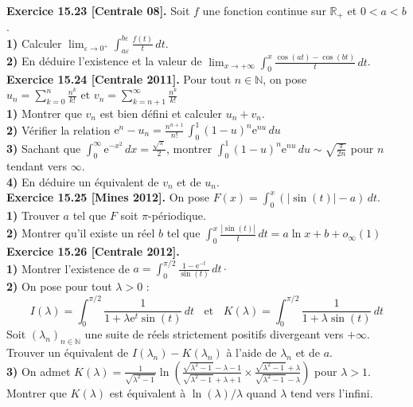 \documentclass[a4paper,12pt,francais]{article}
\newcommand{\field}[1]{\mathbb{#1}}
\newcommand{\N}{\field{N}}
\newcommand{\R}{\field{R}}
\newcommand{\e}{\mbox{e}}
\begin{document}
\noindent
{\bf Exercice 15.23 [Centrale 08].} Soit $f$ une fonction continue sur $\R_+$ et $0<a<b$.\\
{\bf 1)} Calculer $\displaystyle \lim_{\varepsilon \to 0^+} \int_{a\varepsilon}^{b\varepsilon} \frac{f(t)}{t}\, dt$.\\
{\bf 2)} En déduire l'existence et la valeur de $\displaystyle \lim_{x\to +\infty} \int_0^x \frac{\cos(at)-\cos(bt)}{t}\, dt$.\\

\noindent
{\bf Exercice 15.24 [Centrale 2011].} Pour tout $n \in \N$, on pose
$\displaystyle u_n=\sum_{k=0}^n \frac{n^k}{k!} \mbox{ et } v_n=\sum_{k=n+1}^\infty \frac{n^k}{k!}$\\
{\bf 1)} Montrer que $v_n$ est bien défini et calculer $u_n+v_n$.\\
{\bf 2)} Vérifier la relation
$\displaystyle \e^n-u_n=\frac{n^{n+1}}{n!} \, \int_0^1 (1-u)^n \e^{nu}\, du$\\
{\bf 3)} Sachant que $\displaystyle \int_0^\infty \e^{-x^2}\, dx =\frac{\sqrt{\pi}}{2}$, montrer 
$\displaystyle \int_0^1 (1-u)^n \e^{nu}\, du \sim \sqrt{\frac{\pi}{2n}}$ pour $n$ tendant vers $\infty$.\\
{\bf 4)} En déduire un équivalent de $v_n$ et de $u_n$.\\

\noindent
{\bf Exercice 15.25 [Mines 2012].} On pose $F(x)=\int_0^x (|\sin(t)|-a)\, dt$.\\
{\bf 1)} Trouver $a$ tel que $F$ soit $\pi$-périodique.\\
{\bf 2)} Montrer qu'il existe un réel $b$ tel que $\displaystyle \int_0^x \frac{|\sin(t)|}{t}\, dt = a \ln x + b+o_\infty(1)$\\

\noindent
{\bf Exercice 15.26 [Centrale 2012].}\\
{\bf 1)} Montrer l'existence de $\displaystyle a=\int_0^{\pi/2} \frac{1-\e^{-t}}{\sin(t)}\, dt \cdot$\\
{\bf 2)} On pose pour tout $\lambda>0$ :
$$I(\lambda)=\int_0^{\pi/2} \frac{1}{1+\lambda \e^t \sin(t)}\, dt \; \; \mbox{ et }\; \; 
K(\lambda)=\int_0^{\pi/2} \frac{1}{1+\lambda \sin(t)}\, dt $$
Soit $(\lambda_n)_{n \in \N}$ une suite de réels strictement positifs divergeant vers $+\infty$. Trouver un équivalent de $I(\lambda_n)-K(\lambda_n)$ à l'aide de $\lambda_n$ et de $a$.\\
{\bf 3)} On admet $\displaystyle K(\lambda)=\frac{1}{\sqrt{\lambda^2-1\,}} \ln \left({
\frac{\sqrt{\lambda^2-1\,}-\lambda-1}{\sqrt{\lambda^2-1\,}+\lambda+1}\times \frac{\sqrt{\lambda^2-1\,}+\lambda}{\sqrt{\lambda^2-1\,}-\lambda}
}\right)$ pour $\lambda>1$.
Montrer que $K(\lambda)$ est équivalent à $\ln(\lambda)/\lambda$ quand $\lambda$ tend vers l'infini.\\
\end{document}
